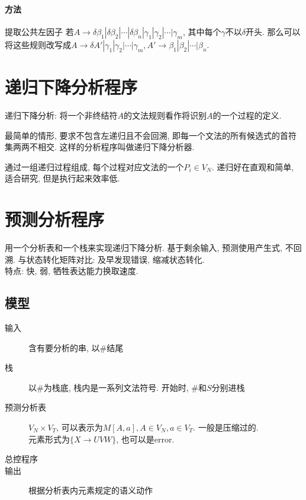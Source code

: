                 \paragraph{方法} \textsf{提取公共左因子}
                    若$A\to\delta\beta_1|\delta\beta_2|\cdots|\delta\beta_n|\gamma_1|\gamma_2|\cdots|\gamma_m$, 其中每个$\gamma$不以$\delta$开头. 那么可以将这些规则改写成$A\to\delta A'|\gamma_1|\gamma_2|\cdots|\gamma_m, A'\to\beta_1|\beta_2|\cdots|\beta_n$.

    \section{递归下降分析程序}

        \textsf{递归下降分析}: 将一个非终结符$A$的文法规则看作将识别$A$的一个过程的定义.

        最简单的情形, 要求不包含左递归且不会回溯, 即每一个文法的所有候选式的首符集两两不相交. 这样的分析程序叫做\textsf{递归下降分析器}.

        通过一组递归过程组成, 每个过程对应文法的一个$P_i\in V_N$. 递归好在直观和简单, 适合研究, 但是执行起来效率低.

    \section{预测分析程序}

        用一个分析表和一个栈来实现递归下降分析. 基于剩余输入, 预测使用产生式, 不回溯. 与状态转化矩阵对比: 及早发现错误, 缩减状态转化.\\
        特点: 快, 弱, 牺牲表达能力换取速度.

        \subsection{模型}

            \begin{description}
                \item[输入] 含有要分析的串, 以\#结尾
                \item[栈] 以\#为栈底, 栈内是一系列文法符号. 开始时, \#和$S$分别进栈
                \item[预测分析表] $V_N\times V_T$, 可以表示为$M[A,a], A\in V_N,a\in V_T$. 一般是压缩过的. \\
                    元素形式为$\{X\to UVW\}$, 也可以是error.
                \item[总控程序]
                \item[输出] 根据分析表内元素规定的语义动作
            \end{description}

